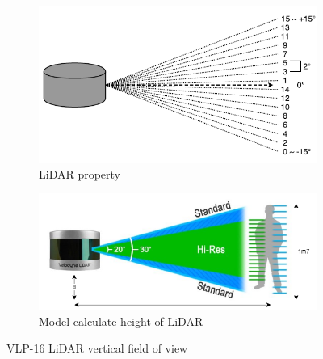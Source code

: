 \begin{figure}[h]
    \centering
    \begin{subfigure}{.5\linewidth}
        \centering
        \includegraphics[width=1.0\linewidth,height = 0.5\linewidth]{figures/chap4_fig/Platform/lidar_property.png}
          \caption{LiDAR property \cite{lidarproperties}}
        \label{chap4:fig1:sub1}
    \end{subfigure}%
    \begin{subfigure}{.5\linewidth}
        \centering
        \includegraphics[width=1.0\linewidth,height = 0.5\linewidth]{figures/chap4_fig/Platform/Untitled Diagram-Page-12.drawio.png}
          \caption{Model calculate height of LiDAR \cite{calculateheight}}
        \label{chap4:fig1:sub2}
    \end{subfigure}
    \caption{VLP-16 LiDAR vertical field of view}
    \label{chap4:fig1}
\end{figure}


